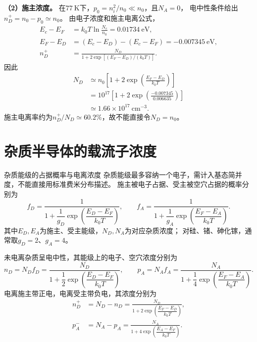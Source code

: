 \begin{problem}
    \textbf{（2）施主浓度。}
    在$77\ \mathrm{K}$下，$p_0=n_i^2/n_0\ll n_0$，且$N_A=0$，
    电中性条件给出$n_D^+=n_0-p_0\simeq n_0$。
    由电子浓度和施主电离公式，
    \begin{align*}
        E_c-E_F&=k_0T\ln\frac{N_c}{n_0}=0.01734\ \mathrm{eV},\\
        E_F-E_D&=(E_c-E_D)-(E_c-E_F)=-0.007345\ \mathrm{eV},\\
        n_D^+&=\frac{N_D}{1+2\exp[(E_F-E_D)/(k_0T)]}.
    \end{align*}
    因此
    \begin{align*}
        N_D&\simeq n_0\left[1+2\exp\!\left(\frac{E_F-E_D}{k_0T}\right)\right]\\
        &=10^{17}\left[1+2\exp\!\left(\frac{-0.007345}{0.006635}\right)\right]\\
        &\boxed{\simeq1.66\times10^{17}\ \mathrm{cm}^{-3}}.
    \end{align*}
    施主电离率约为$n_D^+/N_D\simeq60.2\%$，故不能直接令$N_D=n_0$。
\end{problem}

\section{杂质半导体的载流子浓度}

\begin{theorem}{杂质能级的占据概率与电离浓度}
    杂质能级最多容纳一个电子，需计入基态简并度，不能直接用标准费米分布描述。
    施主被电子占据、受主被空穴占据的概率分别为
    \[
    f_D=\frac{1}{1+\dfrac{1}{g_D}\exp\!\left(\dfrac{E_D-E_F}{k_0T}\right)},
    \qquad
    f_A=\frac{1}{1+\dfrac{1}{g_A}\exp\!\left(\dfrac{E_F-E_A}{k_0T}\right)}.
    \]
    其中$E_D,E_A$为施主、受主能级，$N_D,N_A$为对应杂质浓度；
    对硅、锗、砷化镓，通常取$g_D=2$、$g_A=4$。

    未电离杂质呈电中性，其能级上的电子、空穴浓度分别为
    \[
    n_D=N_Df_D=\frac{N_D}{1+\dfrac{1}{2}\exp\!\left(\dfrac{E_D-E_F}{k_0T}\right)},
    \qquad
    p_A=N_Af_A=\frac{N_A}{1+\dfrac{1}{4}\exp\!\left(\dfrac{E_F-E_A}{k_0T}\right)}.
    \]
    电离施主带正电，电离受主带负电，其浓度分别为
    \begin{align*}
        n_D^+&=N_D-n_D
        =\frac{N_D}{1+2\exp\!\left(\dfrac{E_F-E_D}{k_0T}\right)},\\
        p_A^-&=N_A-p_A
        =\frac{N_A}{1+4\exp\!\left(\dfrac{E_A-E_F}{k_0T}\right)}.
    \end{align*}
\end{theorem}

